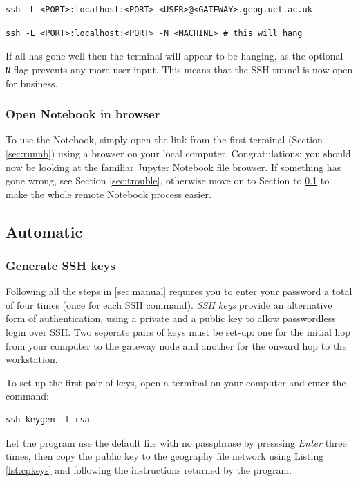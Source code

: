 \documentclass[a4paper]{article}
\begin{document}
\begin{lstlisting}[caption={Tunnel to gateway server}, label={lst:tunnel1}]
ssh -L <PORT>:localhost:<PORT> <USER>@<GATEWAY>.geog.ucl.ac.uk
\end{lstlisting}

\begin{lstlisting}[caption={Tunnel to cluster machine}, label={lst:tunnel2}]
ssh -L <PORT>:localhost:<PORT> -N <MACHINE> # this will hang
\end{lstlisting}

If all has gone well then the terminal will appear to be hanging, as the optional \texttt{-N} flag prevents any more user input.
This means that the SSH tunnel is now open for business.

\subsubsection{Open Notebook in browser}
\label{sec:opennb}

To use the Notebook, simply open the link from the first terminal (Section \ref{sec:runnb}) using a browser on your local computer. 
Congratulations: you should now be looking at the familiar Jupyter Notebook file browser. If something has gone wrong, see Section \ref{sec:trouble}, otherwise move on to Section to \ref{sec:auto} to make the whole remote Notebook process easier.

\subsection{Automatic}
\label{sec:auto}

\subsubsection{Generate SSH keys}
\label{sec:sshkeys}
Following all the steps in \ref{sec:manual} requires you to enter your password a total of four times (once for each SSH command).
\href{https://wiki.archlinux.org/index.php/SSH_keys}{\emph{SSH keys}} provide an alternative form of authentication, using a private and a public key to allow passwordless login over SSH.
Two seperate pairs of keys must be set-up: one for the initial hop from your computer to the gateway node and another for the onward hop to the workstation.

To set up the first pair of keys, open a terminal on your computer and enter the command:
\begin{lstlisting}[caption={Generate SSH keys}, label={lst:genkeys}]
ssh-keygen -t rsa
\end{lstlisting}
Let the program use the default file with no passphrase by presssing \emph{Enter} three times, then copy the public key to the geography file network using Listing \ref{lst:cpkeys} and following the instructions returned by the program.
\end{document}
